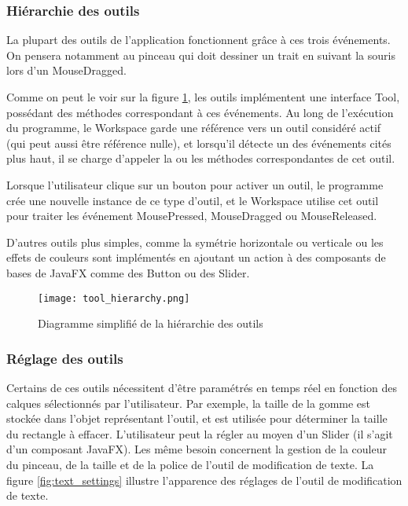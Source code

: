\subsubsection{Hiérarchie des outils}
\label{section_outils}
\par
La plupart des outils de l'application  fonctionnent grâce à ces trois événements. On pensera notamment au pinceau qui doit dessiner un trait en suivant la souris lors d'un MouseDragged.
\par
Comme on peut le voir sur la figure \ref{fig:tool_hier}, les outils implémentent une interface Tool, possédant des méthodes correspondant à ces événements. Au long de l'exécution du programme, le Workspace garde une référence vers un outil considéré actif (qui peut aussi être référence nulle), et lorsqu'il détecte un des événements cités plus haut, il se charge d'appeler la ou les méthodes correspondantes de cet outil.
\par
Lorsque l'utilisateur clique sur un bouton pour activer un outil, le programme crée une nouvelle instance de ce type d'outil, et le Workspace utilise cet outil pour traiter les événement MousePressed, MouseDragged ou MouseReleased.
\par
D'autres outils plus simples, comme la symétrie horizontale ou verticale ou les effets de couleurs sont implémentés en ajoutant un action à des composants de bases de JavaFX comme des Button ou des Slider.

\begin{figure}[H]
	\caption{Diagramme simplifié de la hiérarchie des outils}
	\centering
	\texttt{[image: tool\_hierarchy.png]}
	\label{fig:tool_hier}
\end{figure}

\subsubsection{Réglage des outils} \label{reglage-outils}
Certains de ces outils nécessitent d'être paramétrés en temps réel en fonction des calques sélectionnés par l'utilisateur. Par exemple, la taille de la gomme est stockée dans l'objet représentant l'outil, et est utilisée pour déterminer la taille du rectangle à effacer. L'utilisateur peut la régler au moyen d'un Slider (il s'agit d'un composant JavaFX). Les même besoin concernent la gestion de la couleur du pinceau, de la taille et de la police de l'outil de modification de texte. La figure \ref{fig:text_settings} illustre l'apparence des réglages de l'outil de modification de texte.

